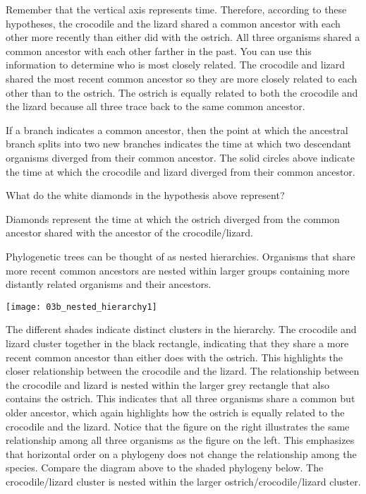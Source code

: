 \documentclass[12pt, hidelinks]{exam}
\newcommand*\AnswerBox[2]{%
    \parbox[t][#1]{0.92\textwidth}{%
    \begin{solution}#2\end{solution}}
}
\begin{document}
Remember that the vertical axis represents time. Therefore, according to
these hypotheses, the crocodile and the lizard shared a common ancestor
with each other more recently than either did with the ostrich. All
three organisms shared a common ancestor with each other farther in the
past. You can use this information to determine who is most closely
related. The crocodile and lizard shared the most recent common ancestor
so they are more closely related to each other than to the ostrich. The
ostrich is equally related to both the crocodile and the lizard because
all three trace back to the same common ancestor.

If a branch indicates a common ancestor, then the point at which the
ancestral branch splits into two new branches indicates the time at
which two descendant organisms diverged from their common ancestor. The
solid circles above indicate the time at which the crocodile and lizard
diverged from their common ancestor.

\begin{questions}
\setcounter{question}{3}


\question
What do the white diamonds in the hypothesis above
represent?

\AnswerBox{7\baselineskip}{Diamonds represent the time at which the ostrich
diverged from the common ancestor shared with the ancestor of the crocodile/lizard.}

\end{questions}

Phylogenetic trees can be thought of as nested hierarchies. Organisms
that share more recent common ancestors are nested within larger groups
containing more distantly related organisms and their ancestors. %

\begin{center}
	\noindent\texttt{[image: 03b\_nested\_hierarchy1]}
\end{center}

The different shades indicate distinct clusters in the hierarchy. The
crocodile and lizard cluster together in the black rectangle, indicating
that they share a more recent common ancestor than either does with the
ostrich. This highlights the closer relationship between the crocodile
and the lizard. The relationship between the crocodile and lizard is
nested within the larger grey rectangle that also contains the ostrich.
This indicates that all three organisms share a common but older
ancestor, which again highlights how the ostrich is equally related to
the crocodile and the lizard. Notice that the figure on the right
illustrates the same relationship among all three organisms as the
figure on the left. This emphasizes that horizontal order on a phylogeny
does not change the relationship among the species. Compare the diagram 
above to the shaded phylogeny below. The crocodile/lizard cluster is nested within
the larger ostrich/crocodile/lizard cluster.
\end{document}
